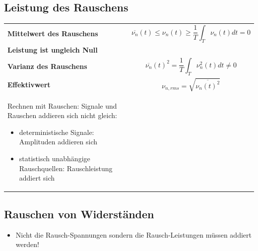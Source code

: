 \subsection{Leistung des Rauschens}
\begin{tabular}{ll}
\textbf{Mittelwert des Rauschens}&
\begin{minipage}{9cm}
\begin{equation}
\overline{\nu_{n}}(t)\leq \nu_{n}(t)\geq \frac{1}{T}\int_{T}\nu_{n}(t)dt=0
\end{equation}
\end{minipage}
\\
\textbf{Leistung ist ungleich Null}&\\
\textbf{Varianz des Rauschens}&
\begin{minipage}{9cm}
\begin{equation}
\overline{\nu_{n}}(t)^2=\frac{1}{T}\int_{T}\nu^2_{n}(t)dt\neq0
\end{equation}
\end{minipage}
\\
\textbf{Effektivwert}&
\begin{minipage}{9cm}
\begin{equation}
\nu_{n,rms}=\sqrt{\overline{\nu_{n}(t)^2}}
\end{equation}
\end{minipage}
\\
\begin{minipage}{9cm}
Rechnen mit Rauschen: Signale und Rauschen addieren sich nicht gleich:
\begin{itemize}
  \item deterministische Signale: Amplituden addieren sich
  \item statistisch unabhängige Rauschquellen: Rauschleistung addiert sich
\end{itemize}
\end{minipage}
&
\\
\end{tabular}

\subsection{Rauschen von Widerständen}
\begin{itemize}
  \item Nicht die Rausch-Spannungen sondern die Rausch-Leistungen müssen addiert werden!
\end{itemize}
